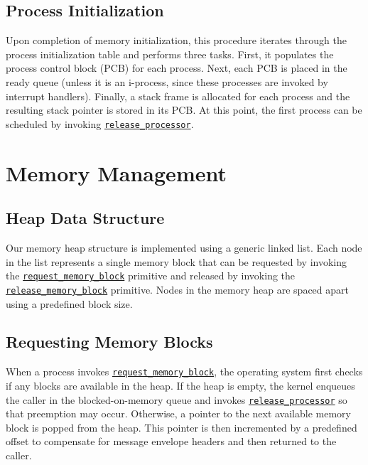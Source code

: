 \documentclass[12pt]{report}
\begin{document}
\subsection{Process Initialization}

Upon completion of memory initialization, this procedure iterates through the process initialization table and performs three tasks. First, it populates the process control block (PCB) for each process. Next, each PCB is placed in the ready queue (unless it is an i-process, since these processes are invoked by interrupt handlers). Finally, a stack frame is allocated for each process and the resulting stack pointer is stored in its PCB. At this point, the first process can be scheduled by invoking \hyperref[alg:releasingtheprocessor]{\texttt{release_processor}}.

\section{Memory Management}

\subsection{Heap Data Structure}

Our memory heap structure is implemented using a generic linked list. Each node in the list represents a single memory block that can be requested by invoking the \hyperref[alg:requestingmemoryblocks]{\texttt{request_memory_block}} primitive and released by invoking the \hyperref[alg:releasingmemoryblocks]{\texttt{release_memory_block}} primitive. Nodes in the memory heap are spaced apart using a predefined block size.

\subsection{Requesting Memory Blocks}

When a process invokes \hyperref[alg:requestingmemoryblocks]{\texttt{request_memory_block}}, the operating system first checks if any blocks are available in the heap. If the heap is empty, the kernel enqueues the caller in the blocked-on-memory queue and invokes \hyperref[alg:releasingtheprocessor]{\texttt{release_processor}} so that preemption may occur. Otherwise, a pointer to the next available memory block is popped from the heap. This pointer is then incremented by a predefined offset to compensate for message envelope headers and then returned to the caller.\\
\end{document}
